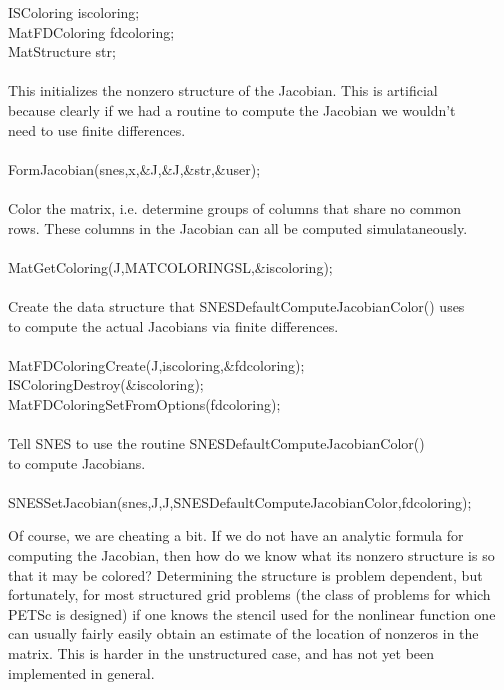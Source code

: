 \begin{tabbing}
   ISColoring    iscoloring;\\
   MatFDColoring fdcoloring;\\
   MatStructure  str;\\

   \trl{/*}\\
      This initializes the nonzero structure of the Jacobian. This is artificial\\
      because clearly if we had a routine to compute the Jacobian we wouldn't\\
      need to use finite differences.\\
   \trl{*/}\\
   FormJacobian(snes,x,\&J,\&J,\&str,\&user);\\

   \trl{/*}\\
       Color the matrix, i.e. determine groups of columns that share no common \\
      rows. These columns in the Jacobian can all be computed simulataneously.\\
   \trl{*/}\\
   MatGetColoring(J,MATCOLORINGSL,\&iscoloring);\\

   \trl{/*}\\
       Create the data structure that SNESDefaultComputeJacobianColor() uses\\
       to compute the actual Jacobians via finite differences.\\
   \trl{*/}\\
   MatFDColoringCreate(J,iscoloring,\&fdcoloring);\\
   ISColoringDestroy(\&iscoloring);\\
   MatFDColoringSetFromOptions(fdcoloring);\\

   \trl{/*}\\
      Tell SNES to use the routine SNESDefaultComputeJacobianColor()\\
      to compute Jacobians.\\
   \trl{*/}\\
   SNESSetJacobian(snes,J,J,SNESDefaultComputeJacobianColor,fdcoloring);\\

\end{tabbing}

Of course, we are cheating a bit. If we do not have an analytic
formula for computing the Jacobian, then how do we know what its
nonzero structure is so that it may be colored?  Determining the
structure is problem dependent, but fortunately, for most structured grid
problems (the class of problems for which PETSc is designed) if one
knows the stencil used for the nonlinear function one can usually
fairly easily obtain an estimate of the location of nonzeros in
the matrix. This is harder in the unstructured case, and has not yet
been implemented in general.

